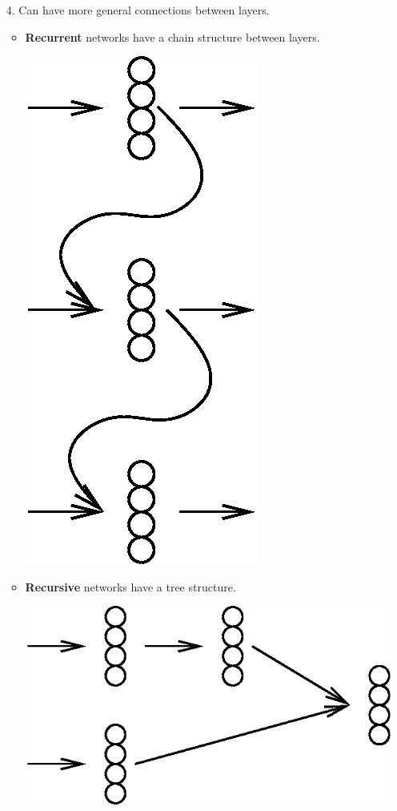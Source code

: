 \documentclass[12pt,t]{beamer}
\begin{document}
\begin{frame}
\begin{itemize}
\item[4.]  Can have more general connections between layers.
\begin{itemize}
\item {\bf Recurrent} networks have a chain structure between layers.

\centerline{
\includegraphics[height=0.4\textheight]{./images/recurrent.png} 
}
\item {\bf Recursive} networks have a tree structure.

\bigskip

\centerline{
\includegraphics[height=0.2\textheight]{./images/recursive.png}
} 
\end{itemize}
\end{itemize}

\end{frame}
\end{document}
